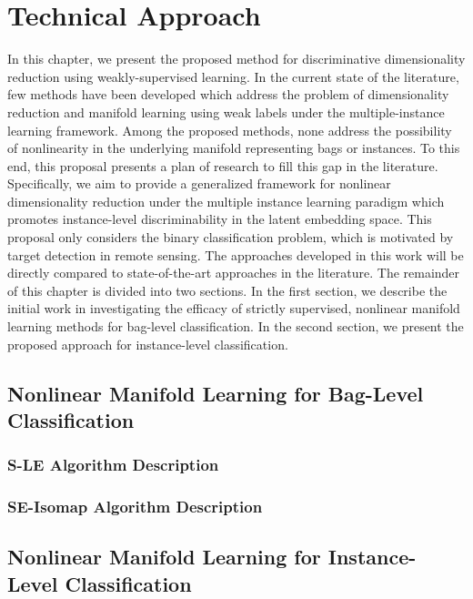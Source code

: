 \chapter{Technical Approach}
In this chapter, we present the proposed method for discriminative dimensionality reduction using weakly-supervised learning. In the current state of the literature, few methods have been developed which address the problem of dimensionality reduction and manifold learning using weak labels under the multiple-instance learning framework.  Among the proposed methods, none address the possibility of nonlinearity in the underlying manifold representing bags or instances. To this end, this proposal presents a plan of research to fill this gap in the literature.  Specifically, we aim to provide a generalized framework for nonlinear dimensionality reduction under the multiple instance learning paradigm which promotes instance-level discriminability in the latent embedding space.  This proposal only considers the binary classification problem, which is motivated by target detection in remote  sensing. The approaches developed in this work will be directly compared to state-of-the-art approaches in the literature.  The remainder of this chapter is divided into two sections.  In the first section, we describe the initial work in investigating the efficacy of strictly supervised, nonlinear manifold learning methods for bag-level classification.  In the second section, we present the proposed approach for instance-level classification.

\section{Nonlinear Manifold Learning for Bag-Level Classification}

\subsection{S-LE Algorithm Description}

\subsection{SE-Isomap Algorithm Description}


\section{Nonlinear Manifold Learning for Instance-Level Classification}

